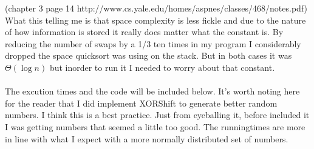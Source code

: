 \documentclass[paper=a4,fontsize=11pt]{article}
\begin{document}
(chapter 3 page 14 http://www.cs.yale.edu/homes/aspnes/classes/468/notes.pdf)
What this telling me is that space complexity is less fickle and due to the nature of how information is stored it really does matter what the constant is. By reducing the number of swaps by a 1/3 ten times in my program I considerably dropped the space quicksort was using on the stack. But in both cases it was $\Theta(\log{n})$ but inorder to run it I needed to worry about that constant.\\\\
The excution times and the code will be included below. It's worth noting here for the reader that I did implement XORShift to generate better random numbers. I think this is a best practice. Just from eyeballing it, before included it I was getting numbers that seemed a little too good. The runningtimes are more in line with what I expect with a more normally distributed set of numbers.\\\\
\newpage
\end{document}
